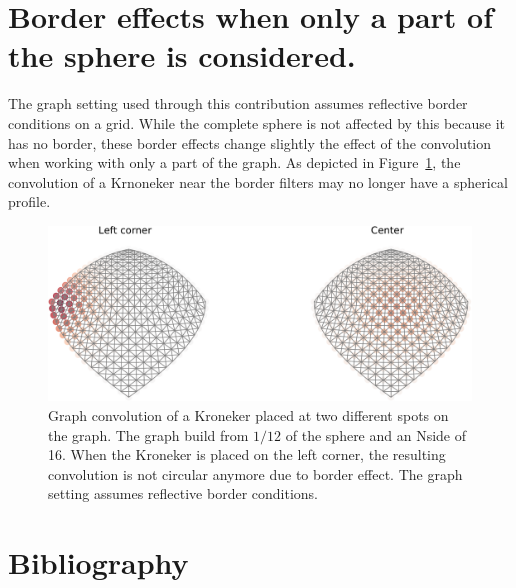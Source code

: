 \documentclass[final,twocolumn,3p,times,authoryear]{elsarticle}
\newcommand{\figref}[1]{Figure~\ref{fig:#1}}
\newcommand{\1}{\b{1}}              %
\newcommand{\0}{\b{0}}              %
\begin{document}
\section{Border effects when only a part of the sphere is considered.}
\label{sec:border_effects}
The graph setting used through this contribution assumes reflective border conditions on a grid. While the complete sphere is not affected by this because it has no border, these border effects change slightly the effect of the convolution when working with only a part of the graph.  As depicted in \figref{border_effects}, the convolution of a Krnoneker near the border filters may no longer have a spherical profile.

\begin{figure}[!ht]
\centering
\includegraphics[width=\linewidth]{figures/border_effects.pdf}
\caption{Graph convolution of a Kroneker placed at two different spots on the graph. The graph build from $1/12$ of the sphere and an Nside of 16. When the Kroneker is placed on the left corner, the resulting convolution is not circular anymore due to border effect. The graph setting assumes reflective border conditions.}
\label{fig:border_effects}
\end{figure}

\section*{Bibliography}


\end{document}
